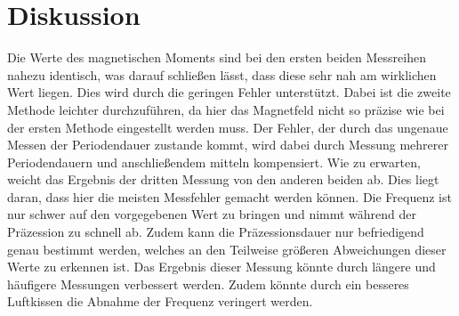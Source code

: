 
\section{Diskussion}
\label{sec:Diskussion}

Die Werte des magnetischen Moments sind bei den ersten beiden Messreihen nahezu identisch, was darauf schließen lässt, dass diese sehr nah am wirklichen Wert liegen. Dies wird durch die geringen Fehler unterstützt. Dabei ist die zweite Methode leichter durchzuführen, da hier das Magnetfeld nicht so präzise wie bei der ersten Methode eingestellt werden muss. Der Fehler, der durch das ungenaue Messen der Periodendauer zustande kommt, wird dabei durch Messung mehrerer Periodendauern und anschließendem mitteln kompensiert.\newline 
Wie zu erwarten, weicht das Ergebnis der dritten Messung von den anderen beiden ab. Dies liegt daran, dass hier die meisten Messfehler gemacht werden können. Die Frequenz ist nur schwer auf den vorgegebenen Wert zu bringen und nimmt während der Präzession zu schnell ab. Zudem kann die Präzessionsdauer nur befriedigend genau bestimmt werden, welches an den Teilweise größeren Abweichungen dieser Werte zu erkennen ist. Das Ergebnis dieser Messung könnte durch längere und häufigere Messungen verbessert werden. Zudem könnte durch ein besseres Luftkissen die Abnahme der Frequenz veringert werden. 